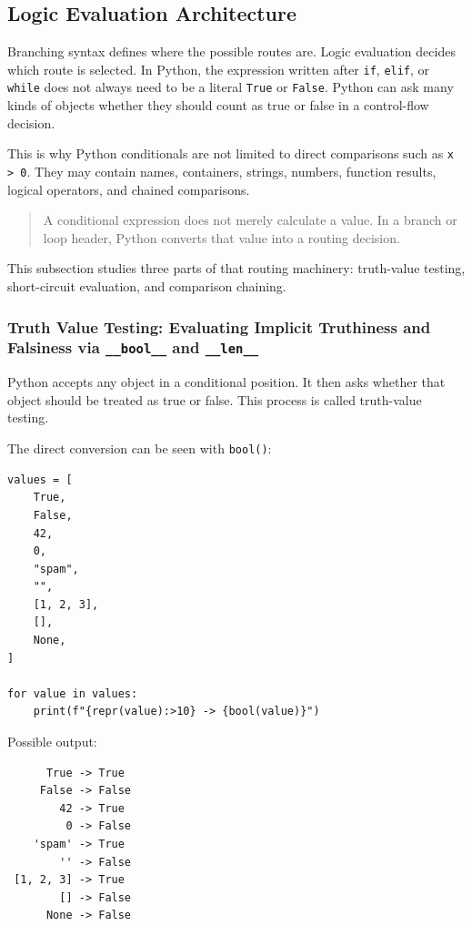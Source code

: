 \documentclass[a4paper,twoside]{report}
\begin{document}
\subsection{Logic Evaluation Architecture}

Branching syntax defines where the possible routes are. Logic evaluation decides which route is selected. In Python, the expression written after \texttt{if}, \texttt{elif}, or \texttt{while} does not always need to be a literal \texttt{True} or \texttt{False}. Python can ask many kinds of objects whether they should count as true or false in a control-flow decision.

This is why Python conditionals are not limited to direct comparisons such as \texttt{x > 0}. They may contain names, containers, strings, numbers, function results, logical operators, and chained comparisons.

\begin{quote}
A conditional expression does not merely calculate a value. In a branch or loop header, Python converts that value into a routing decision.
\end{quote}

This subsection studies three parts of that routing machinery: truth-value testing, short-circuit evaluation, and comparison chaining.

\subsubsection{Truth Value Testing: Evaluating Implicit Truthiness and Falsiness via \texttt{\_\_bool\_\_} and \texttt{\_\_len\_\_}}

Python accepts any object in a conditional position. It then asks whether that object should be treated as true or false. This process is called truth-value testing.

The direct conversion can be seen with \texttt{bool()}:

\begin{verbatim}
values = [
    True,
    False,
    42,
    0,
    "spam",
    "",
    [1, 2, 3],
    [],
    None,
]

for value in values:
    print(f"{repr(value):>10} -> {bool(value)}")
\end{verbatim}

Possible output:

\begin{verbatim}
      True -> True
     False -> False
        42 -> True
         0 -> False
    'spam' -> True
        '' -> False
 [1, 2, 3] -> True
        [] -> False
      None -> False
\end{verbatim}
\end{document}

